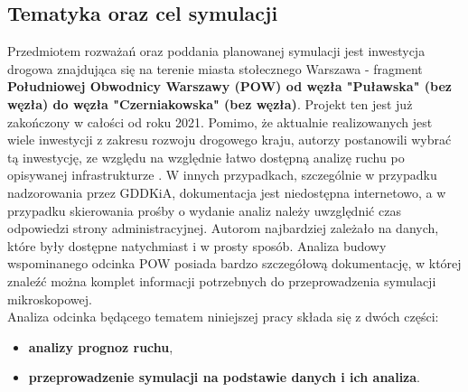 \documentclass[polish]{projectreport}
\begin{document}
\subsection{Tematyka oraz cel symulacji}
\label{sec:topic}

Przedmiotem rozważań oraz poddania planowanej symulacji jest inwestycja drogowa znajdująca się na terenie miasta stołecznego Warszawa - fragment \textbf{Południowej Obwodnicy Warszawy (POW) od węzła "Puławska" (bez węzła) do węzła "Czerniakowska" (bez węzła)}. Projekt ten jest już zakończony w całości od roku 2021. Pomimo, że aktualnie realizowanych jest wiele inwestycji z zakresu rozwoju drogowego kraju, autorzy postanowili wybrać tą inwestycję, ze względu na względnie łatwo dostępną analizę ruchu po opisywanej infrastrukturze \cite{pow_analiza}. W innych przypadkach, szczególnie w przypadku nadzorowania przez GDDKiA, dokumentacja jest niedostępna internetowo, a w przypadku skierowania prośby o wydanie analiz należy uwzględnić czas odpowiedzi strony administracyjnej. Autorom najbardziej zależało na danych, które były dostępne natychmiast i w prosty sposób. Analiza budowy wspominanego odcinka POW posiada bardzo szczegółową dokumentację, w której znaleźć można komplet informacji potrzebnych do przeprowadzenia symulacji mikroskopowej.  \\

\noindent Analiza odcinka będącego tematem niniejszej pracy składa się z dwóch części:
\begin{itemize}
    \item \textbf{analizy prognoz ruchu},
    \item \textbf{przeprowadzenie symulacji na podstawie danych i ich analiza}.
\end{itemize}
\end{document}
